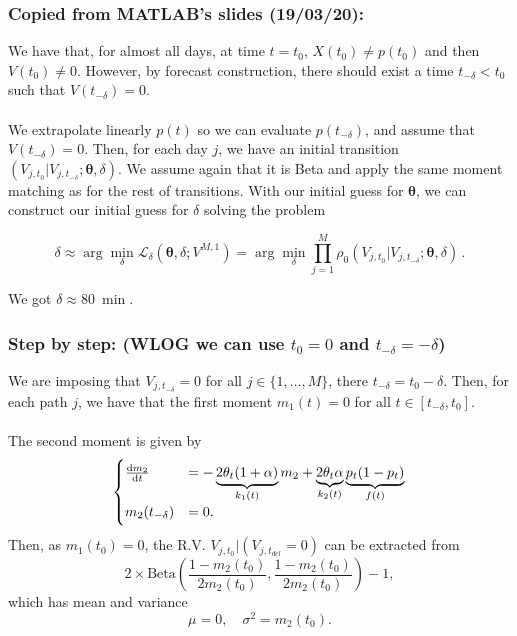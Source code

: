 \documentclass[aspectratio=169]{beamer}\usepackage[utf8]{inputenc}
\begin{document}
\begin{frame}\frametitle{\alert{\textbf{Copied from MATLAB's slides (19/03/20):}}}

We have that, for almost all days, at time $t=t_0$, $X(t_0)\neq p(t_0)$ and then $V(t_0)\neq0$. However, by forecast construction, there should exist a time $t_{-\delta}<t_0$ such that $V(t_{-\delta})=0$.\\
\quad\\
We extrapolate linearly $p(t)$ so we can evaluate $p(t_{-\delta})$, and assume that $V(t_{-\delta})=0$. Then, for each day $j$, we have an initial transition $(V_{j, t_0}|V_{j, t_{-\delta}};\bm{\theta},\delta)$. We assume again that it is Beta and apply the same moment matching as for the rest of transitions. With our initial guess for $\bm{\theta}$, we can construct our initial guess for $\delta$ solving the problem

\begin{equation*}
\delta\approx\arg\min_{\delta}\mathcal{L}_{\delta}(\bm{\theta},\delta; V^{M,1}) = \arg\min_{\delta}\prod\limits_{j=1}^M \rho_0 (V_{j, t_0}|V_{j, t_{-\delta}};\bm{\theta},\delta) \,.
\label{likelihood_delta}
\end{equation*}

\alert{We got $\delta\approx\SI{80}{\min}$.}

\end{frame}


\begin{frame}\frametitle{Step by step: (WLOG we can use $t_0=0$ and $t_{-\delta}=-\delta$)}

We are imposing that $V_{j,t_{-\delta}}=0$ for all $j\in\{1,\dots,M\}$, there $t_{-\delta}=t_0-\delta$. Then, for each path $j$, we have that the first moment $m_1(t)=0$ for all $t\in[t_{-\delta},t_0]$.\\
\quad\\
The second moment is given by
\begin{equation}
\begin{cases}
\frac{\dif m_2}{\dif t}&=-\underbrace{2\theta_t(1+\alpha)}_{k_1(t)}m_2+\underbrace{2\theta_t\alpha}_{k_2(t)} \underbrace{p_t(1-p_t)}_{f(t)}\\
m_2(t_{-\delta})&=0.
\end{cases}
\label{S1}
\end{equation}
Then, as $m_1(t_0)=0$, the R.V. $V_{j,t_0}|(V_{j,t_{del
}}=0)$ can be extracted from
\begin{equation*}
2\times\text{Beta}\left(\frac{1-m_2(t_0)}{2m_2(t_0)},\frac{1-m_2(t_0)}{2m_2(t_0)}\right)-1,
\end{equation*}
which has mean and variance
\begin{equation*}
\mu=0,\quad\sigma^2=m_2(t_0).
\end{equation*}

\end{frame}
\end{document}
